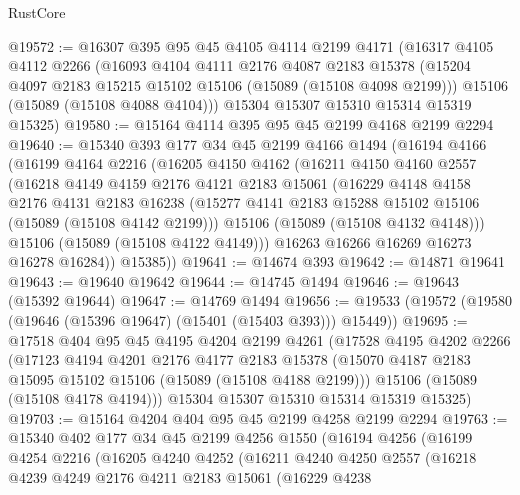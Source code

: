 \begin{lexlean}{RustCore}
\begin{coremodule}
@19572 := @16307
    @395
    @95
    @45
    @4105
    @4114
    @2199
    @4171
    (@16317
      @4105
      @4112
      @2266
      (@16093
        @4104
        @4111
        @2176
        @4087
        @2183
        @15378
        (@15204 @4097 @2183 @15215 @15102 @15106 (@15089 (@15108 @4098 @2199)))
        @15106
        (@15089 (@15108 @4088 @4104)))
      @15304
      @15307
      @15310
      @15314
      @15319
      @15325)
@19580 := @15164 @4114 @395 @95 @45 @2199 @4168 @2199 @2294
@19640 := @15340
    @393
    @177
    @34
    @45
    @2199
    @4166
    @1494
    (@16194
      @4166
      (@16199
        @4164
        @2216
        (@16205
          @4150
          @4162
          (@16211
            @4150
            @4160
            @2557
            (@16218
              @4149
              @4159
              @2176
              @4121
              @2183
              @15061
              (@16229
                @4148
                @4158
                @2176
                @4131
                @2183
                @16238
                (@15277 @4141 @2183 @15288 @15102 @15106 (@15089 (@15108 @4142 @2199)))
                @15106
                (@15089 (@15108 @4132 @4148)))
              @15106
              (@15089 (@15108 @4122 @4149)))
            @16263
            @16266
            @16269
            @16273
            @16278
            @16284))
        @15385))
@19641 := @14674 @393
@19642 := @14871 @19641
@19643 := @19640 @19642
@19644 := @14745 @1494
@19646 := @19643 (@15392 @19644)
@19647 := @14769 @1494
@19656 := @19533 (@19572 (@19580 (@19646 (@15396 @19647) (@15401 (@15403 @393))) @15449))
@19695 := @17518
    @404
    @95
    @45
    @4195
    @4204
    @2199
    @4261
    (@17528
      @4195
      @4202
      @2266
      (@17123
        @4194
        @4201
        @2176
        @4177
        @2183
        @15378
        (@15070 @4187 @2183 @15095 @15102 @15106 (@15089 (@15108 @4188 @2199)))
        @15106
        (@15089 (@15108 @4178 @4194)))
      @15304
      @15307
      @15310
      @15314
      @15319
      @15325)
@19703 := @15164 @4204 @404 @95 @45 @2199 @4258 @2199 @2294
@19763 := @15340
    @402
    @177
    @34
    @45
    @2199
    @4256
    @1550
    (@16194
      @4256
      (@16199
        @4254
        @2216
        (@16205
          @4240
          @4252
          (@16211
            @4240
            @4250
            @2557
            (@16218
              @4239
              @4249
              @2176
              @4211
              @2183
              @15061
              (@16229
                @4238

\end{coremodule}
\end{lexlean}
